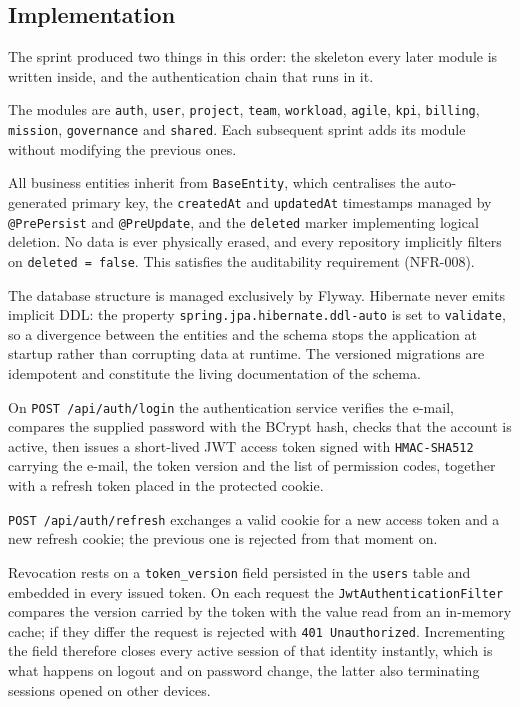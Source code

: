 \subsection{Implementation}
The sprint produced two things in this order: the skeleton every later module is written inside,
and the authentication chain that runs in it.


The modules are \texttt{auth}, \texttt{user}, \texttt{project}, \texttt{team}, \texttt{workload},
\texttt{agile}, \texttt{kpi}, \texttt{billing}, \texttt{mission}, \texttt{governance} and
\texttt{shared}. Each subsequent sprint adds its module without modifying the previous ones.

All business entities inherit from \texttt{BaseEntity}, which centralises the auto-generated primary
key, the \texttt{createdAt} and \texttt{updatedAt} timestamps managed by \texttt{@PrePersist} and
\texttt{@PreUpdate}, and the \texttt{deleted} marker implementing logical deletion. No data is ever
physically erased, and every repository implicitly filters on \texttt{deleted = false}. This
satisfies the auditability requirement (NFR-008).

The database structure is managed exclusively by Flyway. Hibernate never emits implicit DDL: the
property \texttt{spring.jpa.\allowbreak hibernate.\allowbreak ddl-auto} is set to \texttt{validate},
so a divergence between the entities and the schema stops the application at startup rather than
corrupting data at runtime. The versioned migrations are idempotent and constitute the living
documentation of the schema.

On \texttt{POST /api/auth/login} the authentication service verifies the e-mail, compares the
supplied password with the BCrypt hash, checks that the account is active, then issues a short-lived
JWT access token signed with \texttt{HMAC-SHA512} carrying the e-mail, the token version and the
list of permission codes, together with a refresh token placed in the protected cookie.

\texttt{POST /api/auth/refresh} exchanges a valid cookie for a new access token and a new refresh
cookie; the previous one is rejected from that moment on.

Revocation rests on a \texttt{token\_version} field persisted in the \texttt{users} table and
embedded in every issued token. On each request the \texttt{JwtAuthenticationFilter} compares the
version carried by the token with the value read from an in-memory cache; if they differ the request
is rejected with \texttt{401 Unauthorized}. Incrementing the field therefore closes every active
session of that identity instantly, which is what happens on logout and on password change, the
latter also terminating sessions opened on other devices.

